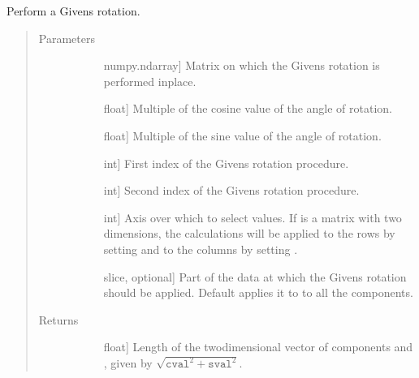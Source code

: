 \documentclass[letterpaper,10pt,english]{sphinxmanual}
\begin{document}
\begin{fulllineitems}
\label{\detokenize{refs/generated/cobyqa.linalg.givens:cobyqa.linalg.givens}}
\sphinxAtStartPar
Perform a Givens rotation.
\begin{quote}\begin{description}
\item[{Parameters}] \leavevmode\begin{description}
\item[{}] \leavevmode{[}numpy.ndarray{]}
\sphinxAtStartPar
Matrix on which the Givens rotation is performed in\sphinxhyphen{}place.

\item[{}] \leavevmode{[}float{]}
\sphinxAtStartPar
Multiple of the cosine value of the angle of rotation.

\item[{}] \leavevmode{[}float{]}
\sphinxAtStartPar
Multiple of the sine value of the angle of rotation.

\item[{}] \leavevmode{[}int{]}
\sphinxAtStartPar
First index of the Givens rotation procedure.

\item[{}] \leavevmode{[}int{]}
\sphinxAtStartPar
Second index of the Givens rotation procedure.

\item[{}] \leavevmode{[}int{]}
\sphinxAtStartPar
Axis over which to select values. If  is a matrix with two
dimensions, the calculations will be applied to the rows by setting
 and to the columns by setting .

\item[{}] \leavevmode{[}slice, optional{]}
\sphinxAtStartPar
Part of the data at which the Givens rotation should be applied.
Default applies it to to all the components.

\end{description}

\item[{Returns}] \leavevmode\begin{description}
\item[{}] \leavevmode{[}float{]}
\sphinxAtStartPar
Length of the two\sphinxhyphen{}dimensional vector of components  and
, given by \(\sqrt{ \mathtt{cval}^2 + \mathtt{sval}^2 }\).


\end{description}
\end{description}
\end{quote}
\end{fulllineitems}
\end{document}
